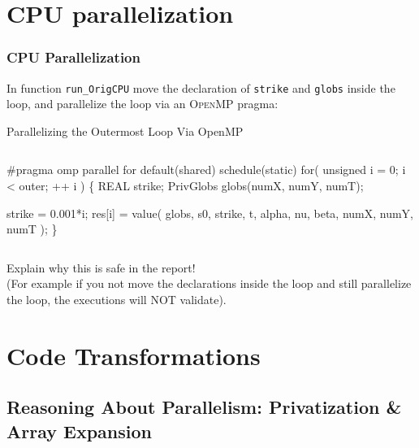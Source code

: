 \documentclass{beamer}
\newcommand{\emphh}[1]{\textcolor{CosGreen}{ #1}}
\begin{document}
\section{CPU parallelization}

\begin{frame}[fragile]
	\tableofcontents[currentsection]
\end{frame}

\begin{frame}[fragile,t]
  \frametitle{CPU Parallelization} %

In function {\tt run\_OrigCPU} move the declaration of
{\tt strike} and {\tt globs} inside the loop, and parallelize
the loop via an \textsc{OpenMP} pragma:

\begin{block}{Parallelizing the Outermost Loop Via OpenMP}
\begin{columns}
\begin{colorcode}
\emphh{\#pragma omp parallel for default(shared) schedule(static)}
    for( unsigned i = 0; i < outer; ++ i ) \{
        REAL strike;
        PrivGlobs    globs(numX, numY, numT);

        strike = 0.001*i;
        res[i] = value( globs, s0, strike, t,
                        alpha, nu,    beta,
                        numX,  numY,  numT );
    \}
\end{colorcode}
\end{columns}
\end{block} 

\alert{Explain why this is safe in the report!}\\
(For example if you not move the declarations inside
the loop and still parallelize the loop, the executions
will NOT validate).

\end{frame}


\section{Code Transformations}

\begin{frame}[fragile]
	\tableofcontents[currentsection]
\end{frame}

\subsection{Reasoning About Parallelism: Privatization \& Array Expansion}
\end{document}

